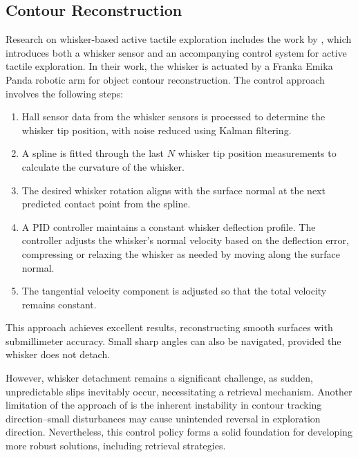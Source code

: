 \subsection{Contour Reconstruction}
Research on whisker-based active tactile exploration includes the work by \textcite{dang2025whisker}, which introduces both a whisker sensor and an accompanying control system for active tactile exploration.
In their work, the whisker is actuated by a Franka Emika Panda robotic arm for object contour reconstruction.
The control approach involves the following steps:
\begin{enumerate}
    \item Hall sensor data from the whisker sensors is processed to determine the whisker tip position, with noise reduced using Kalman filtering.
    \item A spline is fitted through the last $N$ whisker tip position measurements to calculate the curvature of the whisker.
    \item The desired whisker rotation aligns with the surface normal at the next predicted contact point from the spline.
    \item A PID controller maintains a constant whisker deflection profile.
    The controller adjusts the whisker’s normal velocity based on the deflection error, compressing or relaxing the whisker as needed by moving along the surface normal.
    \item The tangential velocity component is adjusted so that the total velocity remains constant.
\end{enumerate}

This approach achieves excellent results, reconstructing smooth surfaces with submillimeter accuracy.
Small sharp angles can also be navigated, provided the whisker does not detach.

However, whisker detachment remains a significant challenge, as sudden, unpredictable slips inevitably occur, necessitating a retrieval mechanism.
Another limitation of the approach of \citeauthor{dang2025whisker} is the inherent instability in contour tracking direction--small disturbances may cause unintended reversal in exploration direction.
Nevertheless, this control policy forms a solid foundation for developing more robust solutions, including retrieval strategies.

